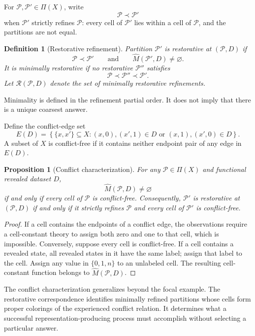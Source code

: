 \documentclass[11pt]{article}
\newtheorem{definition}[assumption]{Definition}
\newtheorem{proposition}[assumption]{Proposition}
\newcommand{\emptysetset}{\varnothing}
\begin{document}
For $\mathcal P,\mathcal P'\in\Pi(X)$, write
\[
\mathcal P\prec\mathcal P'
\]
when $\mathcal P'$ strictly refines $\mathcal P$: every cell of
$\mathcal P'$ lies within a cell of $\mathcal P$, and the partitions are not
equal.

\begin{definition}[Restorative refinement]
Partition $\mathcal P'$ is restorative at $(\mathcal P,D)$ if
\[
\mathcal P\prec\mathcal P'
\qquad\text{and}\qquad
\widehat M(\mathcal P',D)\neq\emptysetset.
\]
It is \emph{minimally restorative} if no restorative $\mathcal P''$ satisfies
\[
\mathcal P\prec\mathcal P''\prec\mathcal P'.
\]
Let $\mathcal R(\mathcal P,D)$ denote the set of minimally restorative
refinements.
\end{definition}

Minimality is defined in the refinement partial order.  It does not imply that
there is a unique coarsest answer.

Define the conflict-edge set
\begin{equation}
E(D)
=
\left\{
\{x,x'\}\subseteq X:
(x,0),(x',1)\in D
\text{ or }(x,1),(x',0)\in D
\right\}.
\label{eq:conflict-edges}
\end{equation}
A subset of $X$ is conflict-free if it contains neither endpoint pair of any
edge in $E(D)$.

\begin{proposition}[Conflict characterization]
\label{prop:conflict-characterization}
For any $\mathcal P\in\Pi(X)$ and functional revealed dataset $D$,
\[
\widehat M(\mathcal P,D)\neq\emptysetset
\]
if and only if every cell of $\mathcal P$ is conflict-free.  Consequently,
$\mathcal P'$ is restorative at $(\mathcal P,D)$ if and only if it strictly
refines $\mathcal P$ and every cell of $\mathcal P'$ is conflict-free.
\end{proposition}

\begin{proof}
If a cell contains the endpoints of a conflict edge, the observations require
a cell-constant theory to assign both zero and one to that cell, which is
impossible.  Conversely, suppose every cell is conflict-free.  If a cell
contains a revealed state, all revealed states in it have the same label;
assign that label to the cell.  Assign any value in $\{0,1,n\}$ to an unlabeled
cell.  The resulting cell-constant function belongs to
$\widehat M(\mathcal P,D)$.
\end{proof}

The conflict characterization generalizes beyond the focal example.  The
restorative correspondence identifies minimally refined partitions whose cells
form proper colorings of the experienced conflict relation.  It determines what
a successful representation-producing process must accomplish without
selecting a particular answer.
\end{document}
